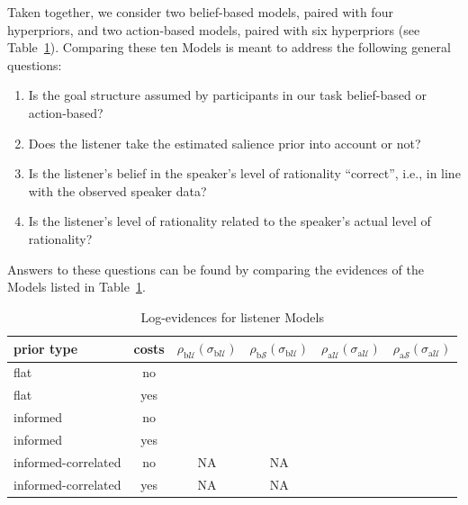 Taken together, we consider two belief-based models, paired with four
hyperpriors, and two action-based models, paired with six hyperpriors
(see Table~\ref{table:listener mod}). Comparing these ten Models is
meant to address the following general questions:
\begin{enumerate}
\item Is the goal structure assumed by participants in our task
  belief-based or action-based?
\item Does the listener take the estimated salience prior into account
  or not?
\item Is the listener's belief in the speaker's level of rationality
  ``correct'', i.e., in line with the observed speaker data?
\item Is the listener's level of rationality related to the speaker's
  actual level of rationality?
\end{enumerate}

Answers to these questions can be found by comparing the evidences of
the Models listed in Table~\ref{table:listener mod}.
%
\begin{table}[htb] 
\caption{Log-evidences for listener Models}
  \centering 
  \begin{tabular}{lccccc}
    prior type & costs &
    $\rho_{\mathrm{b}\mathcal{U}}(\sigma_{\mathrm{b}\mathcal{U}})$ 
    & $\rho_{\mathrm{b}\mathcal{S}}(\sigma_{\mathrm{b}\mathcal{U}})$
    & $\rho_{\mathrm{a}\mathcal{U}}(\sigma_{\mathrm{a}\mathcal{U}})$
    & $\rho_{\mathrm{a}\mathcal{S}}(\sigma_{\mathrm{a}\mathcal{U}})$
    \\ \midrule
    flat
    & no
    & \cellcolor{lightgray!76}{-24.83}
    & \cellcolor{lightgray!94}{-11.66} 
    & \cellcolor{lightgray!77}{-24.06} 
    & \cellcolor{lightgray!75}{-10.62} 
    \\ 
    flat
    & yes
    & \cellcolor{lightgray!76}{-24.80} 
    & \cellcolor{lightgray!96}{-9.84}
    & \cellcolor{lightgray!77}{-23.84}
    & \cellcolor{lightgray!95}{-10.81}
    \\ \addlinespace[0.1cm]
    informed
    & no
    & \cellcolor{lightgray!30}{-59.87} 
    & \cellcolor{lightgray!95}{-10.44}
    & \cellcolor{lightgray!75}{-25.42}
    & \cellcolor{lightgray!98}{-8.48}
    \\
    informed
    & yes
    & \cellcolor{lightgray!18}{-68.43}
    & \cellcolor{lightgray!91}{-13.35}
    & \cellcolor{lightgray!77}{-24.21}
    & \cellcolor{lightgray!93}{-11.85}
    \\ \addlinespace[0.1cm]
    informed-correlated
    & no
    & NA
    & NA
    & \cellcolor{lightgray!23}{-64.70} 
    & \cellcolor{lightgray!100}{-6.80}
    \\
    informed-correlated
    & yes
    & NA
    & NA
    & \cellcolor{lightgray!0}{-82.36} 
    & \cellcolor{lightgray!71}{-29.01}
    \\
  \end{tabular}
  \label{table:listener mod}
\end{table}

